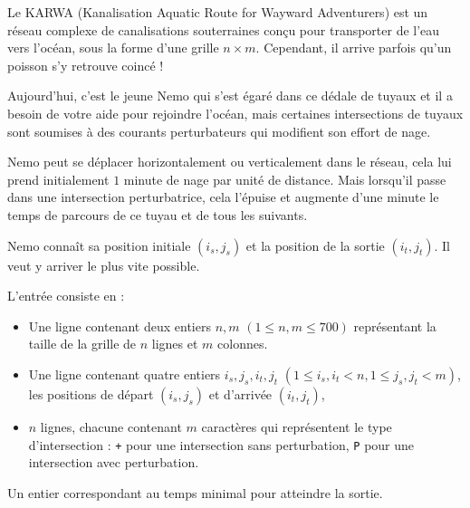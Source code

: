 \problemname{\problemyamlname{}}


Le KARWA (Kanalisation Aquatic Route for Wayward Adventurers) est un réseau complexe de canalisations souterraines conçu pour transporter de l'eau vers l'océan, sous la forme d'une grille $n \times m$. Cependant, il arrive parfois qu'un poisson s'y retrouve coincé !

Aujourd'hui, c'est le jeune Nemo qui s'est égaré dans ce dédale de tuyaux et il a besoin de votre aide pour rejoindre l'océan, mais certaines intersections de tuyaux sont soumises à des courants perturbateurs qui modifient son effort de nage.

Nemo peut se déplacer horizontalement ou verticalement dans le réseau, cela lui prend initialement $1$ minute de nage par unité de distance. Mais lorsqu'il passe dans une intersection perturbatrice, cela l'épuise et augmente d'une minute le temps de parcours de ce tuyau et de tous les suivants.

Nemo connaît sa position initiale $(i_s, j_s)$ et la position de la sortie $(i_t, j_t)$. Il veut y arriver le plus vite possible.

\begin{Input}
    L'entrée consiste en :
    \begin{itemize}
        \item Une ligne contenant deux entiers $n, m$ $(1 \leq n, m \leq 700)$ représentant la taille de la grille de $n$ lignes et $m$ colonnes.
        \item Une ligne contenant quatre entiers $i_s, j_s, i_t, j_t$ $(1 \leq i_s, i_t < n, 1 \leq j_s, j_t < m)$, les positions de départ $(i_s,j_s)$ et d'arrivée $(i_t,j_t)$,
        \item $n$ lignes, chacune contenant $m$ caractères qui représentent le type d'intersection : \texttt{+} pour une intersection sans perturbation, \texttt{P} pour une intersection avec perturbation.
    \end{itemize}
\end{Input}

\begin{Output}
    Un entier correspondant au temps minimal pour atteindre la sortie.
\end{Output}
